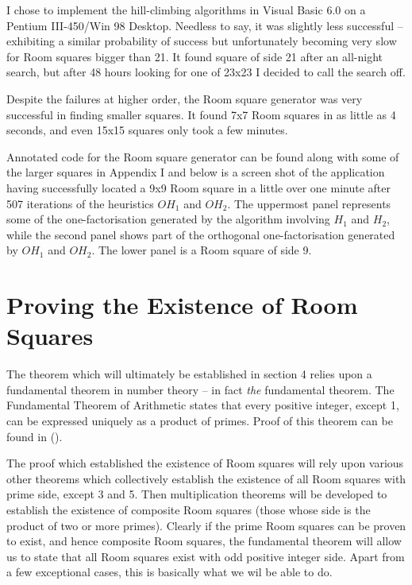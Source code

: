 \documentclass[
  11pt,
  a4paper]{book}
\begin{document}
I chose to implement the hill-climbing algorithms in Visual Basic 6.0 on
a Pentium III-450/Win 98 Desktop. Needless to say, it was slightly less
successful -- exhibiting a similar probability of success but
unfortunately becoming very slow for Room squares bigger than 21. It
found square of side 21 after an all-night search, but after 48 hours
looking for one of 23x23 I decided to call the search off.

Despite the failures at higher order, the Room square generator was very
successful in finding smaller squares. It found 7x7 Room squares in as
little as 4 seconds, and even 15x15 squares only took a few minutes.

Annotated code for the Room square generator can be found along with
some of the larger squares in Appendix I and below is a screen shot of
the application having successfully located a 9x9 Room square in a
little over one minute after 507 iterations of the heuristics \(OH_1\)
and \(OH_2\). The uppermost panel represents some of the
one-factorisation generated by the algorithm involving \(H_1\) and
\(H_2\), while the second panel shows part of the orthogonal
one-factorisation generated by \(OH_1\) and \(OH_2\). The lower panel is
a Room square of side 9.

\hypertarget{proving-the-existence-of-room-squares}{%
\chapter{Proving the Existence of Room
Squares}\label{proving-the-existence-of-room-squares}}

The theorem which will ultimately be established in section 4 relies
upon a fundamental theorem in number theory -- in fact \emph{the}
fundamental theorem. The Fundamental Theorem of Arithmetic states that
every positive integer, except 1, can be expressed uniquely as a product
of primes. Proof of this theorem can be found in
(\textcite{hardy_introduction_1979}).

The proof which established the existence of Room squares will rely upon
various other theorems which collectively establish the existence of all
Room squares with prime side, except 3 and 5. Then multiplication
theorems will be developed to establish the existence of composite Room
squares (those whose side is the product of two or more primes). Clearly
if the prime Room squares can be proven to exist, and hence composite
Room squares, the fundamental theorem will allow us to state that all
Room squares exist with odd positive integer side. Apart from a few
exceptional cases, this is basically what we wil be able to do.
\end{document}
